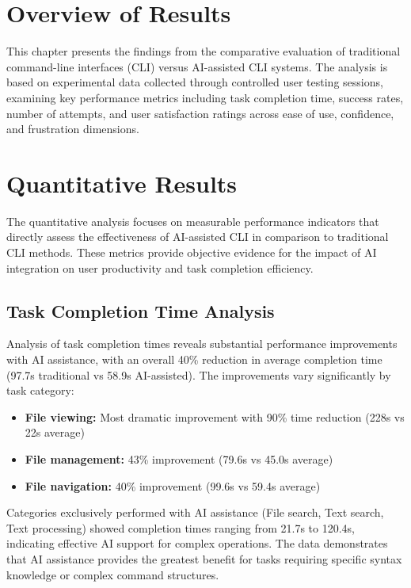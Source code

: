\section{Overview of Results}

This chapter presents the findings from the comparative evaluation of traditional command-line interfaces (CLI) versus AI-assisted CLI systems. The analysis is based on experimental data collected through controlled user testing sessions, examining key performance metrics including task completion time, success rates, number of attempts, and user satisfaction ratings across ease of use, confidence, and frustration dimensions.

\section{Quantitative Results}

The quantitative analysis focuses on measurable performance indicators that directly assess the effectiveness of AI-assisted CLI in comparison to traditional CLI methods. These metrics provide objective evidence for the impact of AI integration on user productivity and task completion efficiency.

\subsection{Task Completion Time Analysis}

Analysis of task completion times reveals substantial performance improvements with AI assistance, with an overall 40\% reduction in average completion time (97.7s traditional vs 58.9s AI-assisted). The improvements vary significantly by task category:

\begin{itemize}
	\item \textbf{File viewing:} Most dramatic improvement with 90\% time reduction (228s vs 22s average)
	\item \textbf{File management:} 43\% improvement (79.6s vs 45.0s average)
	\item \textbf{File navigation:} 40\% improvement (99.6s vs 59.4s average)
\end{itemize}

Categories exclusively performed with AI assistance (File search, Text search, Text processing) showed completion times ranging from 21.7s to 120.4s, indicating effective AI support for complex operations. The data demonstrates that AI assistance provides the greatest benefit for tasks requiring specific syntax knowledge or complex command structures.

